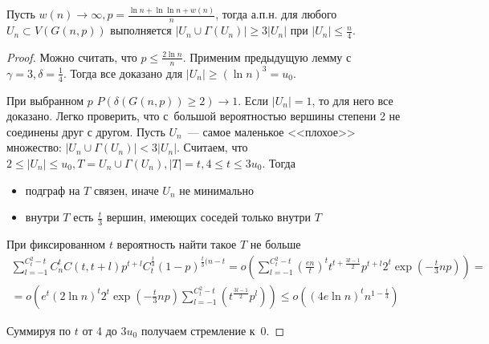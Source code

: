 \documentclass{article}
\begin{document}
\begin{lemma}
	Пусть $w(n) \rightarrow \infty, p = \frac{\ln n + \ln \ln n + w(n)}{n}$, тогда а.п.н. для любого
	$U_n \subset V(G(n, p))$ выполняется $|U_n \cup \Gamma(U_n)| \ge 3|U_n|$ при $|U_n| \le
	\frac{n}{4}$.
\end{lemma}
\begin{proof}
	Можно считать, что $p \le \frac{2 \ln n}{n}$. Применим предыдущую лемму с~$\gamma = 3, \delta =
	\frac{1}{4}$. Тогда все доказано для $|U_n| \ge (\ln n)^3 = u_0$.

	При выбранном $p$ $P(\delta(G(n, p)) \ge 2) \rightarrow 1$. Если $|U_n| = 1$, то для него все
	доказано. Легко проверить, что с~большой вероятностью вершины степени 2 не соединены друг с
	другом. Пусть $U_n$~--- самое маленькое <<плохое>> множество: $|U_n \cup \Gamma(U_n)| < 3|U_n|$.
	Считаем, что $2 \le |U_n| \le u_0, T = U_n \cup \Gamma(U_n), |T| = t, 4 \le t \le 3u_0$. Тогда
	\begin{itemize}
		\item подграф на $T$ связен, иначе $U_n$ не минимально
		\item внутри $T$ есть $\frac{t}{3}$ вершин, имеющих соседей только внутри $T$
	\end{itemize}

	При фиксированном $t$ вероятность найти такое $T$ не больше
	\begin{multline*}
		\sum\limits_{l=-1}^{C_t^2 - t} C_n^t
		C(t, t + l) p^{t+l} C_t^{\frac{t}{3}} (1-p)^{\frac{t}{3}(n-t} = o\left(
		\sum\limits_{l=-1}^{C_t^2-t} \left(\frac{en}{t} \right)^t t^{t + \frac{3l - 1}{2}} p^{t+l} 2^t
		\exp(-\frac{t}{3} np)\right) =\\
		= o\left( e^t (2 \ln n)^t 2^t \exp(-\frac{t}{3} np)
		\sum\limits_{l=-1}^{C_t^2-t} (t^\frac{3l-1}{2} p^l) \right) \le o\left( (4e \ln n)^t n^{1 -
		\frac{t}{3}} \right)
	\end{multline*}

	Суммируя по $t$ от 4 до $3u_0$ получаем стремление к~0.
\end{proof}
\end{document}
